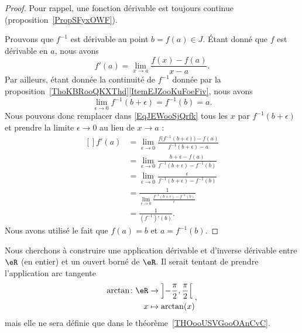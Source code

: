 \begin{proof}
	Pour rappel, une fonction dérivable est toujours continue (proposition~\ref{PropSFyxOWF}).

	Prouvons que \( f^{-1}\) est dérivable au point \( b=f(a)\in J\). Étant donné que \( f\) est dérivable en \( a\), nous avons
	\begin{equation}\label{EqJEWooSjQrfk}
		f'(a)=\lim_{x\to a} \frac{ f(x)-f(a) }{ x-a }.
	\end{equation}
	Par ailleurs, étant donnée la continuité de \( f^{-1}\) donnée par la proposition~\ref{ThoKBRooQKXThd}\ref{ItemEJZooKuFoeFiv}, nous avons
	\begin{equation}
		\lim_{\epsilon\to 0} f^{-1}(b+\epsilon)=f^{-1}(b)=a.
	\end{equation}
	Nous pouvons donc remplacer dans \eqref{EqJEWooSjQrfk} tous les \( x\) par \( f^{-1}(b+\epsilon)\) et prendre la limite \( \epsilon\to 0\) au lieu de \( x\to a\) :
	\begin{equation}
		\begin{aligned}[]
			f'(a) & =\lim_{\epsilon\to 0}\frac{ f\big( f^{-1}(b+\epsilon) \big)-f(a) }{ f^{-1}(b+\epsilon)-a } \\
			      & =\lim_{\epsilon\to 0}\frac{ b+\epsilon-f(a) }{ f^{-1}(b+\epsilon)-f^{-1}(b) }              \\
			      & =\lim_{\epsilon\to 0}\frac{ \epsilon }{ f^{-1}(b+\epsilon)-f^{-1}(b) }                     \\
			      & =\frac{1}{ \lim_{\epsilon\to 0}\frac{ f^{-1}(b+\epsilon)-f^{-1}(b) }{ \epsilon } }         \\
			      & =\frac{1}{ (f^{-1})'(b) }.
		\end{aligned}
	\end{equation}
	Nous avons utilisé le fait que \( f(a)=b\) et \( a=f^{-1}(b)\).
\end{proof}

Nous cherchons à construire une application dérivable et d'inverse dérivable entre \( \eR\) (en entier) et un ouvert borné de \( \eR\). Il serait tentant de prendre l'application arc tangente
\begin{equation}
	\begin{aligned}
		\arctan\colon \eR & \to \left] -\frac{ \pi }{2} , \frac{ \pi }{2} \right[ \\
		x                 & \mapsto \arctan(x)
	\end{aligned},
\end{equation}
mais elle ne sera définie que dans le théorème~\ref{THOooUSVGooOAnCvC}.


